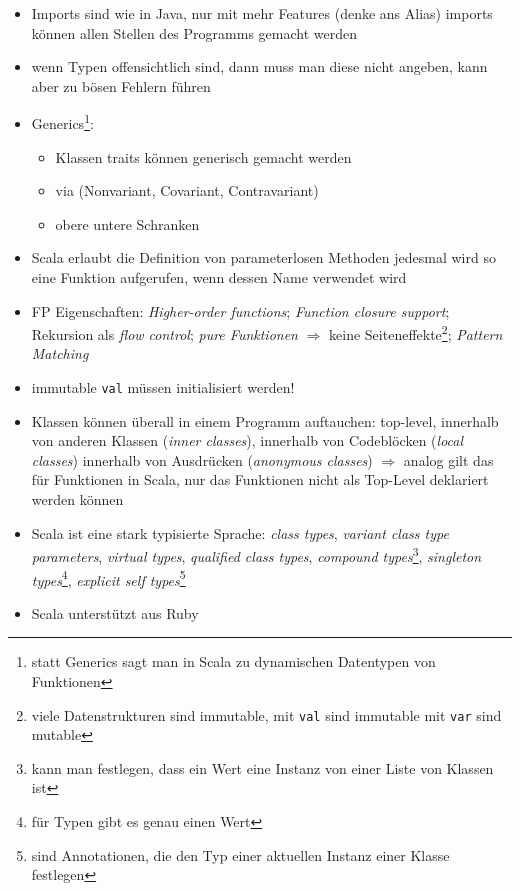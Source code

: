 \begin{itemize}
\begin{itemize}
  \end{itemize}
  \item Imports sind wie in Java, nur mit mehr Features (denke ans
  Alias) \und imports können allen Stellen des Programms gemacht werden
  \item wenn Typen offensichtlich sind, dann muss man diese nicht angeben, kann
  aber zu bösen Fehlern führen
  \item Generics\footnote{statt Generics sagt man in Scala zu 
  dynamischen Datentypen von Funktionen }:
  \begin{itemize}
    \item Klassen \und traits können generisch gemacht werden
    \item via  (Nonvariant, Covariant, Contravariant)
    \item obere \und untere Schranken
  \end{itemize}
  \item Scala erlaubt die Definition von parameterlosen Methoden \und jedesmal
  wird so eine Funktion aufgerufen, wenn dessen Name verwendet wird
  \item FP Eigenschaften: \textit{Higher-order functions}; 
  \textit{Function closure support}; Rekursion als \textit{flow control}; 
  \textit{pure Funktionen} $\Rightarrow$ keine 
  Seiteneffekte\footnote{viele Datenstrukturen sind immutable, mit 
  \texttt{val} sind immutable \und mit \texttt{var} sind mutable};
  \textit{Pattern Matching}
  \item immutable \texttt{val} müssen initialisiert werden!  
  \item Klassen können überall in einem Programm auftauchen: top-level,
  innerhalb von anderen Klassen (\textit{inner classes}), innerhalb von
  Codeblöcken (\textit{local classes}) \und innerhalb von Ausdrücken 
  (\textit{anonymous classes}) $\Rightarrow$ analog gilt das für Funktionen
  in Scala, nur das Funktionen nicht als Top-Level deklariert werden können
  \item Scala ist eine stark typisierte Sprache: \textit{class types},
  \textit{variant class type parameters}, \textit{virtual types}, 
  \textit{qualified class types},  \textit{compound types}\footnote{kann
  man festlegen, dass ein Wert eine Instanz von einer Liste von Klassen
  ist}, \textit{singleton types}\footnote{für Typen gibt es genau einen
  Wert}, \textit{explicit self types}\footnote{sind Annotationen, die den Typ 
  einer aktuellen Instanz einer Klasse festlegen}
  \item Scala unterstützt  aus Ruby

\end{itemize}

